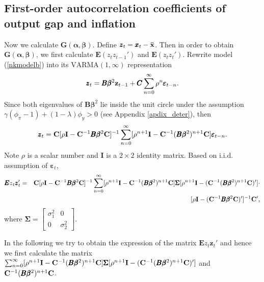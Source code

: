 \begin{appendix}
\section{First-order autocorrelation coefficients of output gap and inflation} \label{acfnkc}
Now we calculate $\pmb G(\pmb\alpha,\pmb\beta)$. Define ${\pmb
z}_t={\pmb x}_t-\bf \bar{x}$. Then in order to obtain $\pmb
G(\pmb\alpha,\pmb\beta)$, we first calculate $\pmb E(z_tz_{t-1}')$
and $\pmb E(z_{t}z_{t}')$. Rewrite model (\ref{nkmodelb}) into its $\mbox{VARMA}(1,\infty)$ representation
 \begin{equation}\label{modeln30}
   {\pmb z}_{t}=\pmb{B\beta}^2{\bf z}_{t-1}+{\pmb C}\sum_{n=0}^\infty\rho^n{\pmb\varepsilon}_{t-n}.
\end{equation}
Since both eigenvalues of $\pmb{ B\beta}^2$ lie inside the unit circle under the assumption $\gamma(\phi_\pi-1)+(1-\lambda)\phi_y>0$ (see Appendix \ref{apdix_deter}), then
\begin{eqnarray*}\label{modeln3}
    {\pmb z}_{t}={\bf C}[\rho
         {\bf I}-{\bf C}^{-1}\pmb {B\beta}^2{\bf C}]^{-1}\sum_{n=0}^\infty[\rho^{n+1}
        {\bf I}-{\bf C}^{-1}(\pmb {B\beta}^2)^{n+1}{\bf C}]{\pmb \varepsilon}_{t-n}.
\end{eqnarray*}
Note $\rho$ is a scalar number and $\pmb I$ is a $2\times 2$ identity
matrix. Based on i.i.d. assumption of ${\pmb\varepsilon}_{t}$,
\begin{eqnarray}
  {\pmb Ez}_{t}{\pmb z}_t' &=&{\bf C}[\rho
         {\bf I}-{\bf C}^{-1}\pmb {B\beta}^2{\bf C}]^{-1}\sum_{n=0}^\infty[\rho^{n+1}
        {\bf I}-{\bf C}^{-1}(\pmb {B\beta}^2)^{n+1}{\bf C}]{\pmb\Sigma}[\rho^{n+1}{\bf I}-({\bf C}^{-1}(\pmb {B\beta}^2)^{n+1}{\bf C})']\cdot\nonumber\\
         &&[\rho
         {\bf I}-({\bf C}^{-1}\pmb {B\beta}^2{\bf C})']^{-1} {\bf C}',\label{varzm}
\end{eqnarray}
where ${\pmb\Sigma}=\left[\begin{array}{cc}
\sigma_1^2&0\\
0&\sigma_2^2
\end{array}\right].$

In the following we try to obtain the expression of the matrix ${\pmb
Ez}_{t}{\pmb z}_t'$ and hence we first calculate the matrix
$\sum_{n=0}^\infty[\rho^{n+1}
        {\bf I}-{\bf C}^{-1}(\pmb {B\beta}^2)^{n+1}{\bf C}]{\pmb\Sigma}[\rho^{n+1}{\bf I}-({\bf C}^{-1}(\pmb {B\beta}^2)^{n+1}{\bf C})']$ and ${\bf C}^{-1}(\pmb {B\beta}^2)^{n+1}{\bf C}$.


\end{appendix}
